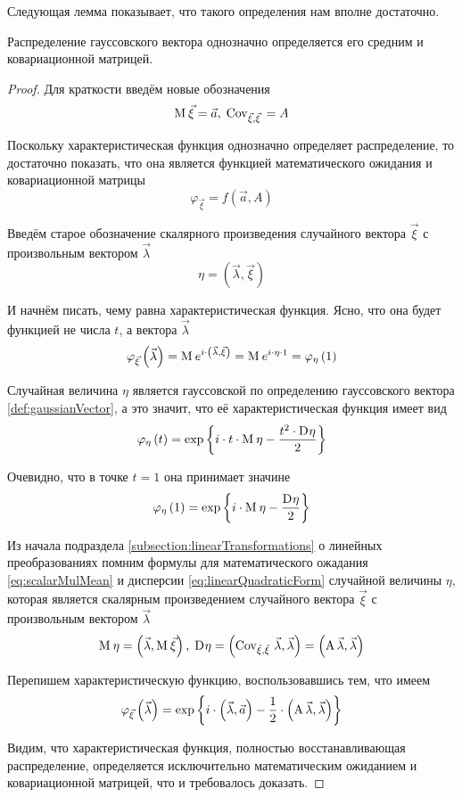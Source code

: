 Следующая лемма показывает, что такого определения нам вполне достаточно.

\begin{lemma}
    Распределение гауссовского вектора однозначно определяется его средним и
    ковариационной матрицей.
\end{lemma}
\begin{proof}
    Для краткости введём новые обозначения
    $$\mathrm{M}_{}\,\vec{\xi} = \vec{a},\; \mathrm{Cov}_{\vec{\xi}, \vec{\xi}}\, = A$$

    Поскольку характеристическая функция однозначно определяет распределение,
    то достаточно показать, что она является функцией математического ожидания
    и ковариационной матрицы
    $$\varphi_{\vec{\xi}} = f\left( \vec{a}, A \right)$$

    Введём старое обозначение скалярного произведения случайного вектора
    $\vec{\xi}$ с произвольным вектором $\vec{\lambda}$
    $$\eta = \left( \vec{\lambda}, \vec{\xi} \right)$$

    И начнём писать, чему равна характеристическая функция. Ясно, что она будет
    функцией не числа $t$, а вектора $\vec{\lambda}$
    $$\varphi_{\vec{\xi}}\left( \vec{\lambda} \right)
        = \mathrm{M}_{}\,e^{i \cdot \left( \vec{\lambda}, \vec{\xi} \right)}
        = \mathrm{M}_{}\,e^{i \cdot \eta \cdot 1}
        = \varphi_{\eta}\left( 1 \right)$$

    Случайная величина $\eta$ является гауссовской по определению гауссовского
    вектора \ref{def:gaussianVector}, а это значит, что её характеристическая
    функция имеет вид
    $$\varphi_{\eta}\left( t \right)
        = \exp{\left\{ i \cdot t \cdot \mathrm{M}_{}\,\eta
            - \frac{t^2 \cdot \mathrm{D}_{} \eta}{2} \right\}}$$

    Очевидно, что в точке $t=1$ она принимает значине
    $$\varphi_{\eta}\left( 1 \right)
        = \exp{\left\{ i \cdot \mathrm{M}_{}\,\eta
            - \frac{\mathrm{D}_{} \eta}{2} \right\}}$$

    Из начала подраздела \ref{subsection:linearTransformations} о линейных
    преобразованиях помним формулы для математического ожадания
    \eqref{eq:scalarMulMean} и дисперсии \eqref{eq:linearQuadraticForm}
    случайной величины $\eta$, которая является скалярным произведением
    случайного вектора $\vec{\xi}$ с произвольным вектором $\vec{\lambda}$
    $$\mathrm{M}_{}\,\eta = \left( \vec{\lambda}, \mathrm{M}_{}\,\vec{\xi} \right),\;
        \mathrm{D}_{} \eta
            = \left( \mathrm{\mathrm{Cov}_{\vec{\xi}, \vec{\xi}}\,}\, {\vec{\lambda}},
                \vec{\lambda} \right)
            = \left( \mathrm{A}\, {\vec{\lambda}},
                \vec{\lambda} \right)$$

    Перепишем характеристическую функцию, воспользовавшись тем, что имеем
    $$\varphi_{\vec{\xi}}\left( \vec{\lambda} \right)
        = \exp{\left\{ i \cdot \left( \vec{\lambda}, \vec{a} \right)
            - \frac{1}{2} \cdot \left( \mathrm{A}\, {\vec{\lambda}},
                \vec{\lambda} \right) \right\}}$$

    Видим, что характеристическая функция, полностью восстанавливающая
    распределение, определяется исключительно математическим ожиданием
    и ковариационной матрицей, что и требовалось доказать.
\end{proof}

